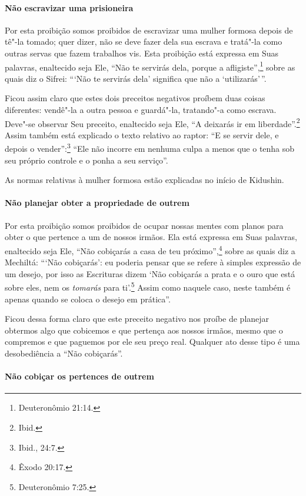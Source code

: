\begin{multicols}{2}
\paragraph{Não escravizar uma prisioneira}

Por esta proibição somos proibidos de escravizar uma mulher formosa
depois de tê"-la tomado; quer dizer, não se deve fazer dela sua escrava e
tratá"-la como outras servas que fazem trabalhos vis. Esta proibição está
expressa em Suas palavras, enaltecido seja Ele, ``Não te servirás dela,
porque a afligiste'',\footnote{Deuteronômio 21:14.} sobre as quais diz o Sifrei\starr:
```Não te servirás dela' significa que não a `utilizarás'\,''.

Ficou assim claro que estes dois preceitos negativos proíbem duas coisas
diferentes: vendê"-la a outra pessoa e guardá"-la, tratando"-a como
escrava. Deve"-se observar Seu preceito, enaltecido seja Ele, ``A
deixarás ir em liberdade''.\footnote{Ibid.} Assim também está explicado o texto
relativo ao raptor: ``E se servir dele, e depois o vender'':\footnote{Ibid.,
24:7.} ``Ele não incorre em nenhuma culpa a menos que o tenha sob seu
próprio controle e o ponha a seu serviço''.

As normas relativas à mulher formosa estão explicadas no início de Kidushin\starr.

\paragraph{Não planejar obter a propriedade de outrem}

Por esta proibição somos proibidos de ocupar nossas mentes com planos
para obter o que pertence a um de nossos irmãos. Ela está expressa em
Suas palavras, enaltecido seja Ele, ``Não cobiçarás a casa de teu
próximo'',\footnote{Êxodo 20:17.} sobre as quais diz a Mechiltá\starr: ```Não
cobiçarás': eu poderia pensar que se refere à simples expressão de um
desejo, por isso as Escrituras dizem `Não cobiçarás a prata e o ouro que
está sobre eles, nem os \emph{tomarás} para ti'.\footnote{Deuteronômio 7:25.}
Assim como naquele caso, neste também é apenas quando se coloca o
desejo em prática''.

Ficou dessa forma claro que este preceito negativo nos proíbe de
planejar obtermos algo que cobicemos e que pertença aos nossos irmãos,
mesmo que o compremos e que paguemos por ele seu preço real. Qualquer
ato desse tipo é uma desobediência a ``Não cobiçarás''.

\paragraph{Não cobiçar os pertences de outrem}


\end{multicols}
